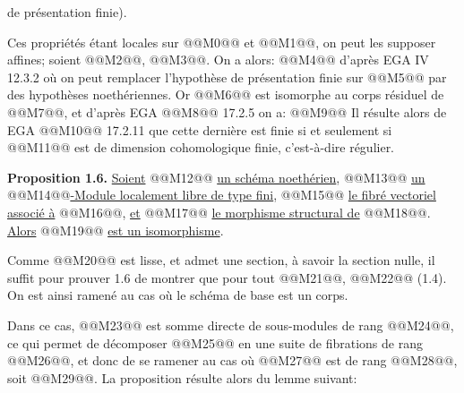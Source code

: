 
de présentation finie).

Ces propriétés étant locales sur @@M0@@ et @@M1@@, on peut les supposer affines; soient @@M2@@, @@M3@@. On a alors:
@@M4@@
d'après EGA IV 12.3.2 où on peut remplacer l'hypothèse de présentation finie sur @@M5@@ par des hypothèses noethériennes. Or @@M6@@ est isomorphe au corps résiduel de @@M7@@, et d'après EGA @@M8@@ 17.2.5 on a:
@@M9@@
Il résulte alors de EGA @@M10@@ 17.2.11 que cette dernière est finie si et seulement si @@M11@@ est de dimension cohomologique finie, c'est-à-dire régulier.

\textbf{Proposition 1.6.} \uline{Soient} @@M12@@ \uline{un schéma noethérien}, @@M13@@ \uline{un} @@M14@@\uline{-Module localement libre de type fini}, @@M15@@ \uline{le fibré vectoriel associé à} @@M16@@, \uline{et} @@M17@@ \uline{le morphisme structural de} @@M18@@. \uline{Alors} @@M19@@ \uline{est un isomorphisme}.

Comme @@M20@@ est lisse, et admet une section, à savoir la section nulle, il suffit pour prouver 1.6 de montrer que pour tout @@M21@@, @@M22@@ (1.4). On est ainsi ramené au cas où le schéma de base est un corps.

Dans ce cas, @@M23@@ est somme directe de sous-modules de rang @@M24@@, ce qui permet de décomposer @@M25@@ en une suite de fibrations de rang @@M26@@, et donc de se ramener au cas où @@M27@@ est de rang @@M28@@, soit @@M29@@. La proposition résulte alors du lemme suivant:

